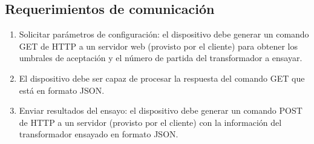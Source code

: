 \subsection{Requerimientos de comunicación}
\label{subsec:ReqCom}
	\begin{enumerate}
	\item Solicitar parámetros de configuración: el dispositivo debe generar un comando GET de HTTP a un servidor web (provisto por el cliente) para obtener los umbrales de aceptación y el número de partida del transformador a ensayar.
	\item El dispositivo debe ser capaz de procesar la respuesta del comando GET que está en formato JSON.
	\item Enviar resultados del ensayo: el dispositivo debe generar un comando POST de HTTP a un servidor (provisto por el cliente) con la información del transformador ensayado en formato JSON.
	\end{enumerate}
